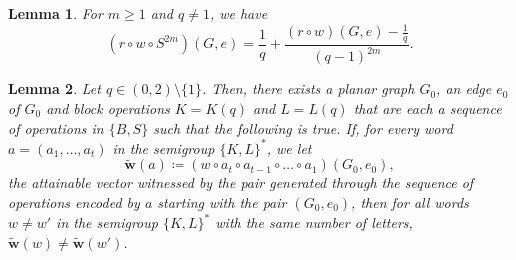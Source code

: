 \documentclass[10pt,a4paper]{amsart}
\newtheorem{lemma}{Lemma}
\begin{document}
\begin{lemma}
    \label{lem:S2_powers}
    For $m \geq 1$ and $q \neq 1$, we have 
    \begin{equation}\label{eq:ratio_S_2m}
        (r \circ w \circ S^{2m})(G,e) = \frac{1}{q} + \frac{(r \circ w)(G,e) - \frac{1}{q}}{(q-1)^{2m}}.
    \end{equation}
\end{lemma}

\begin{lemma}\label{lem:ping_pong_02} Let $q \in (0,2)\setminus \{1\}$. Then, there exists a planar graph $G_0$, an edge $e_0$ of $G_0$ and block operations $K=K(q)$ and $L=L(q)$ that are each a sequence of operations in $\{B,S\}$ such that the following is true.  If, for every word $a = (a_1,\dots,a_t)$ in the semigroup $\{K,L\}^\ast $, we let 
     \[\widetilde{\mathbf{w}}(a) \coloneqq (w\circ a_t\circ a_{t-1}\circ\dots\circ a_1)(G_0,e_0),\]
     the attainable vector witnessed by the pair generated through the sequence of operations encoded by $a$ starting with the pair $(G_0,e_0)$, then for all words $w\ne w'$ in the semigroup $\{K,L\}^\ast$ with the same number of letters,  $\widetilde{\mathbf{w}}(w)\neq \widetilde{\mathbf{w}}(w')$.
    
\end{lemma}
\end{document}
